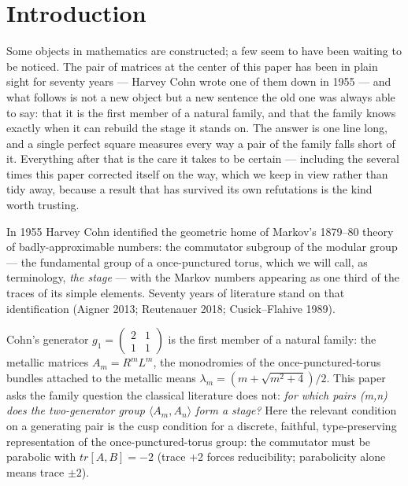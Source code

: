 \documentclass[11pt]{article}
\theoremstyle{plain}
\theoremstyle{definition}
\theoremstyle{remark}
\begin{document}
\section{Introduction}

Some objects in mathematics are constructed; a few seem to have been waiting to be noticed. The pair of matrices at the center of this paper has been in plain sight for seventy years — Harvey Cohn wrote one of them down in 1955 — and what follows is not a new object but a new sentence the old one was always able to say: that it is the first member of a natural family, and that the family knows exactly when it can rebuild the stage it stands on. The answer is one line long, and a single perfect square measures every way a pair of the family falls short of it. Everything after that is the care it takes to be certain — including the several times this paper corrected itself on the way, which we keep in view rather than tidy away, because a result that has survived its own refutations is the kind worth trusting.

In 1955 Harvey Cohn identified the geometric home of Markov's 1879–80 theory of badly-approximable numbers: the commutator subgroup of the modular group — the fundamental group of a once-punctured torus, which we will call, as terminology, \emph{the stage} — with the Markov numbers appearing as one third of the traces of its simple elements. Seventy years of literature stand on that identification (Aigner 2013; Reutenauer 2018; Cusick–Flahive 1989).

Cohn's generator \(g_{1} = \left(\begin{smallmatrix}2 & 1\\1 & 1\end{smallmatrix}\right)\) is the first member of a natural family: the metallic matrices \(A_{m} = R^{m} L^{m}\), the monodromies of the once-punctured-torus bundles attached to the metallic means \(\lambda _{m} = (m + \sqrt{m^{2}+4})/2\). This paper asks the family question the classical literature does not: \emph{for which pairs (m,n) does the two-generator group \(\langle A_{m}, A_{n}\rangle \) form a stage?} Here the relevant condition on a generating pair is the cusp condition for a discrete, faithful, type-preserving representation of the once-punctured-torus group: the commutator must be parabolic with \(tr[A,B] = -2\) (trace +2 forces reducibility; parabolicity alone means trace \(\pm 2\)).
\end{document}
